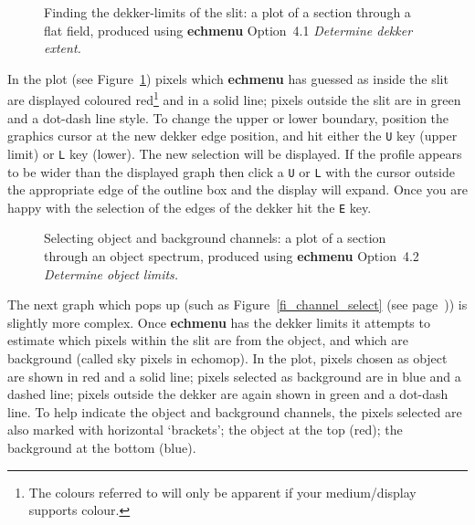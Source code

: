 \documentclass[twoside,11pt]{article}
\newcommand{\scspec}[2]{#1}
\newcommand{\scspec}[2]{#2}
\begin{document}
\begin{figure}
\begin{center}
  \scspec{\leavevmode\epsfysize=100mm\epsfbox{sc7_12.eps}}
         {\leavevmode\epsfysize=136mm}

  \parbox{140mm}{ 
    \caption{Finding the dekker-limits of the slit: a plot of a section
             through a flat field, produced using {\bf echmenu} Option~4.1 
             {\sl Determine dekker extent.}}
    \label{fi_dekker_limits}
  }
\end{center}
\end{figure}

In the plot (see \scspec{Figure~\ref{fi_dekker_limits}}{the figure above})
pixels which {\bf echmenu} has guessed as inside the slit are
displayed coloured
red\scspec{\footnote{The colours referred to will only be apparent if your
medium/display supports colour.}}
{(the colours referred to here will only be apparent if your
medium/display supports colour)}
and in a solid line; pixels outside the slit
are in green and a dot-dash line style.  To change the upper or lower
boundary, position the graphics cursor at the new dekker edge position,
and hit either the \verb+U+ key (upper limit) or \verb+L+ key (lower).
The new selection will be displayed.  If the profile appears to be wider
than the displayed graph then click a \verb+U+ or \verb+L+ with the
cursor outside the appropriate edge of the outline box and the display
will expand.  Once you are happy with the selection of the edges of
the dekker hit the \verb+E+ key.

\begin{htmlonly}
\begin{figure}
\begin{center}
  \leavevmode\epsfysize=136mm

  \parbox{140mm}{
    \caption{Selecting object and background channels: a plot of a section
             through an object spectrum, produced using {\bf echmenu} 
             Option~4.2 {\sl Determine object limits.}}
    \label{fi_channel_select_again}
  }
\end{center}
\end{figure}
\end{htmlonly}

The next graph which pops up (such as
\scspec{Figure~\ref{fi_channel_select} (see page~\pageref{fi_channel_select})}
{the figure above}) is slightly more complex.  Once {\bf echmenu} has the
dekker limits it attempts to estimate which pixels within the slit are from
the object, and which are background (called sky pixels in {\sc echomop})\@.
In the plot, pixels chosen as object are shown in red and a solid line;
pixels selected as background are in blue and a dashed line;
pixels outside the dekker are again shown in green and a dot-dash line.
To help indicate the object and background channels, the pixels selected
are also marked with horizontal `brackets'; the object at the top (red);
the background at the bottom (blue).
\end{document}
